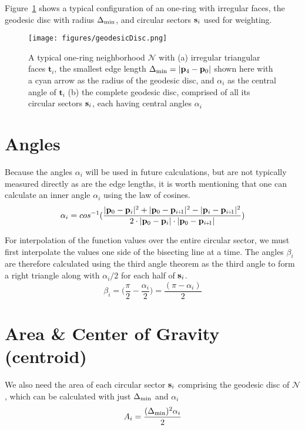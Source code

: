 Figure~\ref{fig:geodesicDisc} shows a typical configuration of an one-ring with irregular faces, the geodesic disc with radius 
$\Delta_\text{min}$, and circular sectors $\mathbf{s}_i$ used for weighting.
\begin{figure}[ht]
\ffigbox
	{\texttt{[image: figures/geodesicDisc.png]}}
	{\caption[One-ring and geodesic disc]{A typical one-ring neighborhood $\mathcal{N}$ with (a) irregular triangular faces $\mathbf{t}_i$, the smallest edge length $\Delta_\text{min} = |\mathbf{p}_4 - \mathbf{p}_0|$ shown here with a cyan arrow as the radius of the geodesic disc, and $\alpha_i$ as the central angle of $\mathbf{t}_i$ (b) the complete geodesic disc, comprised of all its circular sectors $\mathbf{s}_i$, each having central angles $\alpha_i$}\label{fig:geodesicDisc}}
\end{figure}%
%

%
\section{Angles}
Because the angles $\alpha_i$ will be used in future calculations, but are not typically measured directly as are the edge lengths, it is worth mentioning that one can calculate an inner angle $\alpha_i$ using the law of cosines. 
\begin{equation}
	\alpha_i = cos^{-1}(\frac{|\bp_0 - \bp_{i}|^2 + |\bp_0 - \bp_{\sipo}|^2 - |\bp_i - \bp_{\sipo}|^2}{2\cdot|\bp_0 - \bp_{i}|\cdot|\bp_0 - \bp_{\sipo}|})
	\label{eq:alphaFromEdgeLengths}
\end{equation}

For interpolation of the function values over the entire circular sector, we must first interpolate the values one side of the bisecting line at a time. The angles $\beta_i$ are therefore calculated using the third angle theorem as the third angle to form a right triangle along with $\alpha_i/2$ for each half of $\mathbf{s}_i$. 
\begin{equation}
	\beta_i = \Big(\frac{\pi}{2} - \frac{\alpha_i}{2}\Big) = \frac{(\pi - \alpha_i)}{2}
	\label{eq:betaFromHalfAlpha}
\end{equation}
%
\section{Area \& Center of Gravity (centroid)} 
We also need the area of each circular sector $\mathbf{s}_i$ comprising the geodesic disc of $\mathcal{N}$, which can be calculated with just $\Delta_\text{min}$ and $\alpha_i$
\begin{equation}
	A_i = \frac{(\Delta_\text{min})^2\alpha_i}{2}
	\label{eq:circularSectorArea}
\end{equation}
%
%

